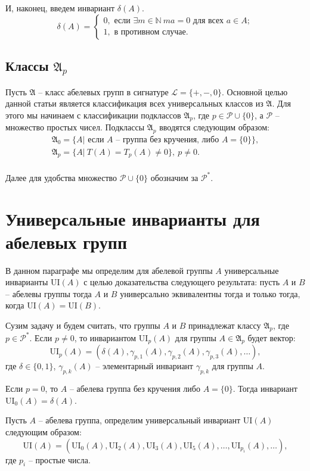 \documentclass[a4paper,11pt,twoside]{article}
\def\A{{\mathfrak{A}}}
\def\P{{\mathcal{P}}}
\def\L{{\mathcal{L}}}
\def\N{{\mathbb{N}}}
\def\ui{{\mathrm{UI}}}
\begin{document}
И, наконец, введем инвариант $\delta(A)$.
$$\delta(A) = \left\lbrace 
\begin{array}{l}  
0, \text{ если } \exists m \in \N \ ma = 0 \text{ для всех } a \in A; \\ 
1, \text{ в противном случае.}
\end{array} 
\right.$$


\subsection{Классы $\A_p$}

Пусть $\A$ -- класс абелевых групп в сигнатуре $\L = \{+, -, 0\}.$ Основной целью данной статьи является классификация всех универсальных классов из $\A$. Для этого мы начинаем с классификации подклассов $\A_p$, где $p \in \P \cup \{0\}$, а $\P$ -- множество простых чисел. Подклассы $\A_p$ вводятся следующим образом:
$$\begin{array}{c}

\A_0 = \{A |\text{ если } A \text{ -- группа без кручения, либо } A = \{0\} \}, \\
\A_p = \{A | \ T(A) = T_p(A) \neq 0 \}, \ p \neq 0. \\
\end{array}$$ 

Далее для удобства множество $\P \cup \{0\}$ обозначим за $\P^*.$


\section{Универсальные инварианты для абелевых групп}

В данном параграфе мы определим для абелевой группы $A$ универсальные инварианты $\ui(A)$ с целью доказательства следующего результата: пусть $A$ и $B$ -- абелевы группы тогда $A$ и $B$ универсально эквивалентны тогда и только тогда, когда $\ui(A) = \ui(B)$.

Сузим задачу и будем считать, что группы $A$ и $B$ принадлежат классу $\A_p$, где $p \in \P^*$. Если $p \neq 0$, то инвариантом $\ui_p(A)$ для группы $A \in \A_p$ будет вектор:
$$\ui_p(A) = (\delta(A), \gamma_{p,1}(A), \gamma_{p,2}(A), \gamma_{p,3}(A), \ldots),$$
где $\delta \in \{0,1\}$, $\gamma_{p,k}(A)$ -- элементарный инвариант $\gamma_{p,k}$ для группы $A$.

Если $p = 0$, то $A$ -- абелева группа без кручения либо $A = \{0\}$. Тогда инвариант $\ui_0(A) = \delta(A)$.


Пусть $A$ -- абелева группа, определим универсальный инвариант $\ui(A)$ следующим образом:
$$\ui(A) = (\ui_{0}(A), \ui_{2}(A), \ui_{3}(A),\ui_{5}(A),\ldots, \ui_{p_i}(A), \ldots),$$
где $p_i$ -- простые числа.
\end{document}
